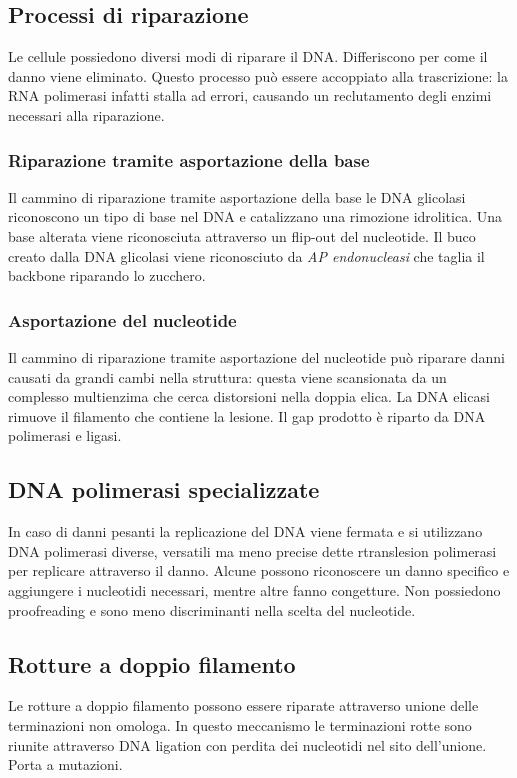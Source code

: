 	\subsection{Processi di riparazione}
	Le cellule possiedono diversi modi di riparare il DNA.
	Differiscono per come il danno viene eliminato.
	Questo processo pu\`o essere accoppiato alla trascrizione: la RNA polimerasi infatti stalla ad errori, causando un reclutamento degli enzimi necessari alla riparazione.

		\subsubsection{Riparazione tramite asportazione della base}
		Il cammino di riparazione tramite asportazione della base le DNA glicolasi riconoscono un tipo di base nel DNA e catalizzano una rimozione idrolitica.
		Una base alterata viene riconosciuta attraverso un flip-out del nucleotide.
		Il buco creato dalla DNA glicolasi viene riconosciuto da \emph{AP endonucleasi} che taglia il backbone riparando lo zucchero.

		\subsubsection{Asportazione del nucleotide}
		Il cammino di riparazione tramite asportazione del nucleotide pu\`o riparare danni causati da grandi cambi nella struttura: questa viene scansionata da un complesso multienzima che cerca distorsioni nella doppia elica.
		La DNA elicasi rimuove il filamento che contiene la lesione.
		Il gap prodotto \`e riparto da DNA polimerasi e ligasi.

	\subsection{DNA polimerasi specializzate}
	In caso di danni pesanti la replicazione del DNA viene fermata e si utilizzano DNA polimerasi diverse, versatili ma meno precise dette rtranslesion polimerasi per replicare attraverso il danno.
	Alcune possono riconoscere un danno specifico e aggiungere i nucleotidi necessari, mentre altre fanno congetture.
	Non possiedono proofreading e sono meno discriminanti nella scelta del nucleotide.

	\subsection{Rotture a doppio filamento}
	Le rotture a doppio filamento possono essere riparate attraverso unione delle terminazioni non omologa.
	In questo meccanismo le terminazioni rotte sono riunite attraverso DNA ligation con perdita dei nucleotidi nel sito dell'unione.
	Porta a mutazioni.

